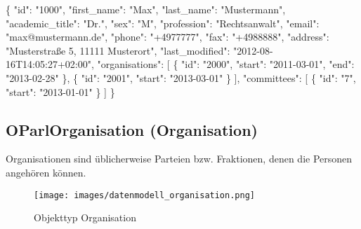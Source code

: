 \documentclass[,a4paper]{article}
\makeatletter
\newenvironment{Shaded}{}{}
\newcommand{\DataTypeTok}[1]{\textcolor[rgb]{0.56,0.13,0.00}{{#1}}}
\newcommand{\StringTok}[1]{\textcolor[rgb]{0.25,0.44,0.63}{{#1}}}
\newcommand{\NormalTok}[1]{{#1}}
\def\maxwidth{\ifdim\Gin@nat@width>\linewidth\linewidth
\else\Gin@nat@width\fi}
\let\Oldincludegraphics\includegraphics
\renewcommand{\includegraphics}[1]{\Oldincludegraphics[width=\maxwidth]{#1}}
\makeatother
\begin{document}
\begin{Shaded}
\begin{Highlighting}[]
\NormalTok{\{}
    \DataTypeTok{"id"}\NormalTok{: }\StringTok{"1000"}\NormalTok{,}
    \DataTypeTok{"first_name"}\NormalTok{: }\StringTok{"Max"}\NormalTok{,}
    \DataTypeTok{"last_name"}\NormalTok{: }\StringTok{"Mustermann"}\NormalTok{,}
    \DataTypeTok{"academic_title"}\NormalTok{: }\StringTok{"Dr."}\NormalTok{,}
    \DataTypeTok{"sex"}\NormalTok{: }\StringTok{"M"}\NormalTok{,}
    \DataTypeTok{"profession"}\NormalTok{: }\StringTok{"Rechtsanwalt"}\NormalTok{,}
    \DataTypeTok{"email"}\NormalTok{: }\StringTok{"max@mustermann.de"}\NormalTok{,}
    \DataTypeTok{"phone"}\NormalTok{: }\StringTok{"+4977777"}\NormalTok{,}
    \DataTypeTok{"fax"}\NormalTok{: }\StringTok{"+4988888"}\NormalTok{,}
    \DataTypeTok{"address"}\NormalTok{: }\StringTok{"Musterstraße 5, 11111 Musterort"}\NormalTok{,}
    \DataTypeTok{"last_modified"}\NormalTok{: }\StringTok{"2012-08-16T14:05:27+02:00"}\NormalTok{,}
    \DataTypeTok{"organisations"}\NormalTok{: [}
        \NormalTok{\{}
            \DataTypeTok{"id"}\NormalTok{: }\StringTok{"2000"}\NormalTok{,}
            \DataTypeTok{"start"}\NormalTok{: }\StringTok{"2011-03-01"}\NormalTok{,}
            \DataTypeTok{"end"}\NormalTok{: }\StringTok{"2013-02-28"}
        \NormalTok{\},}
        \NormalTok{\{}
            \DataTypeTok{"id"}\NormalTok{: }\StringTok{"2001"}\NormalTok{,}
            \DataTypeTok{"start"}\NormalTok{: }\StringTok{"2013-03-01"}
        \NormalTok{\}}
    \NormalTok{],}
    \DataTypeTok{"committees"}\NormalTok{: [}
        \NormalTok{\{}
            \DataTypeTok{"id"}\NormalTok{: }\StringTok{"7"}\NormalTok{,}
            \DataTypeTok{"start"}\NormalTok{: }\StringTok{"2013-01-01"}
        \NormalTok{\}}
    \NormalTok{]}
\NormalTok{\}}
\end{Highlighting}
\end{Shaded}

\subsection{OParlOrganisation (Organisation)}

Organisationen sind üblicherweise Parteien bzw. Fraktionen, denen die
Personen angehören können.

\begin{figure}[htbp]
\centering
\texttt{[image: images/datenmodell\_organisation.png]}
\caption{Objekttyp Organisation}
\end{figure}
\end{document}

